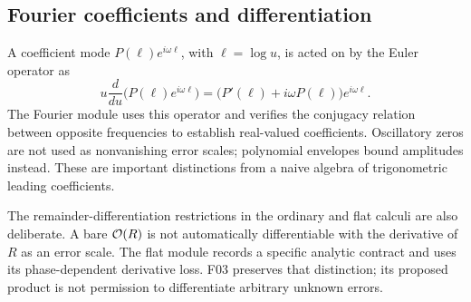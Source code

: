 \subsection{Fourier coefficients and differentiation}

A coefficient mode $P(\ell)e^{i\omega\ell}$, with $\ell=\log u$, is acted on by the Euler operator as
\[
 u\frac{d}{du}\bigl(P(\ell)e^{i\omega\ell}\bigr)
 =\bigl(P'(\ell)+i\omega P(\ell)\bigr)e^{i\omega\ell}.
\]
The Fourier module uses this operator and verifies the conjugacy relation between opposite frequencies to establish real-valued coefficients. Oscillatory zeros are not used as nonvanishing error scales; polynomial envelopes bound amplitudes instead. These are important distinctions from a naive algebra of trigonometric leading coefficients.\cite{fourier}

The remainder-differentiation restrictions in the ordinary and flat calculi are also deliberate. A bare $\mathcal{O}(R)$ is not automatically differentiable with the derivative of $R$ as an error scale. The flat module records a specific analytic contract and uses its phase-dependent derivative loss. F03 preserves that distinction; its proposed product is not permission to differentiate arbitrary unknown errors.\cite{seriesops,flat,flatops,dlmf21}
